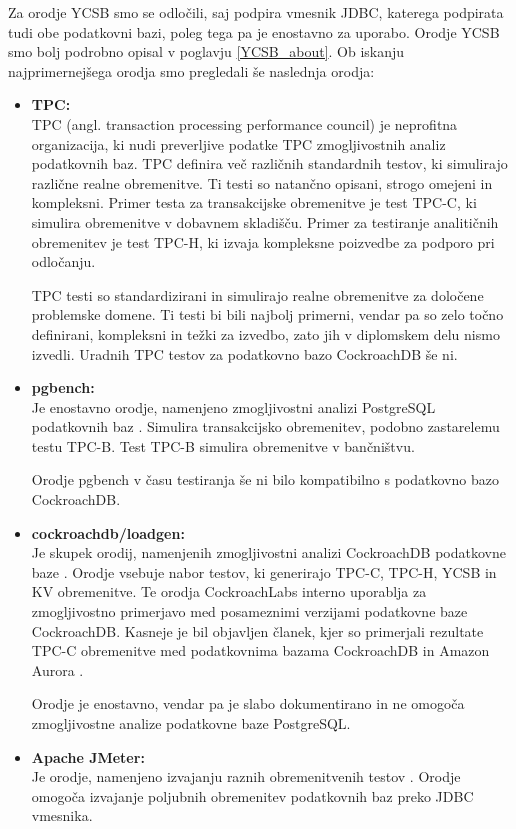 \documentclass[a4paper, 12pt]{book}
\begin{document}
Za orodje YCSB smo se odločili, saj podpira vmesnik JDBC, katerega podpirata tudi obe podatkovni bazi, poleg tega pa je enostavno za uporabo. Orodje YCSB smo bolj podrobno opisal v poglavju \ref{YCSB_about}. Ob iskanju najprimernejšega orodja smo pregledali še naslednja orodja:

\begin{itemize}
    \item \textbf{TPC:}\\ TPC (angl. transaction processing performance council) \cite{TPC-home} je neprofitna organizacija, ki nudi preverljive podatke TPC zmogljivostnih analiz podatkovnih baz. TPC definira več različnih standardnih testov, ki simulirajo različne realne obremenitve. Ti testi so natančno opisani, strogo omejeni in kompleksni. Primer testa za transakcijske obremenitve je test TPC-C, ki simulira obremenitve v dobavnem skladišču. Primer za testiranje analitičnih obremenitev je test TPC-H, ki izvaja kompleksne poizvedbe za podporo pri odločanju.
    
    TPC testi so standardizirani in simulirajo realne obremenitve za dolo\-čene problemske domene. Ti testi bi bili najbolj primerni, vendar pa so zelo točno definirani, kompleksni in težki za izvedbo, zato jih v diplomskem delu nismo izvedli. Uradnih TPC testov za podatkovno bazo CockroachDB še ni.
    \item \textbf{pgbench:}\\ Je enostavno orodje, namenjeno zmogljivostni analizi PostgreSQL podatkovnih baz \cite{pgbench}. Simulira transakcijsko obremenitev, podobno zastarelemu testu TPC-B. Test TPC-B simulira obremenitve v bančni\-štvu. 
    
    Orodje pgbench v času testiranja še ni bilo kompatibilno s podatkovno bazo CockroachDB.
    \item \textbf{cockroachdb/loadgen:}\\ Je skupek orodij, namenjenih zmogljivostni analizi CockroachDB podatkovne baze \cite{cockroachdb/loadgen}. Orodje vsebuje nabor testov, ki generirajo TPC-C, TPC-H, YCSB in KV obremenitve. Te orodja CockroachLabs interno uporablja za zmogljivostno primerjavo med posameznimi verzijami podatkovne baze CockroachDB. Kasneje je bil objavljen članek, kjer so primerjali rezultate TPC-C obremenitve med podatkovnima bazama CockroachDB in Amazon Aurora \cite{CRDB-tpcc-vs-aurora}.

    Orodje je enostavno, vendar pa je slabo dokumentirano in ne omogoča zmogljivostne analize podatkovne baze PostgreSQL.
    \item \textbf{Apache JMeter:}\\ Je orodje, namenjeno izvajanju raznih obremenitvenih testov \cite{jmeter}. Orod\-je omogoča izvajanje poljubnih obremenitev podatkovnih baz preko JDBC vmesnika.
    

\end{itemize}
\end{document}
